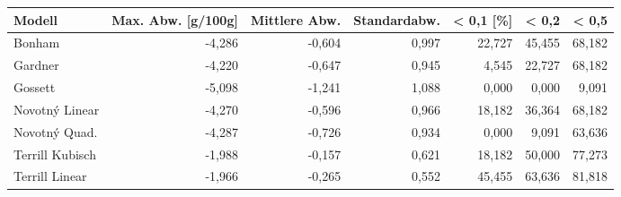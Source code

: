 \begin{tabular}{lrrrrrr}
\toprule
         Modell &  Max. Abw. [g/100g] &  Mittlere Abw. &  Standardabw. &  < 0,1 [\%] &  < 0,2 &  < 0,5 \\
\midrule
         Bonham &              -4,286 &         -0,604 &         0,997 &     22,727 & 45,455 & 68,182 \\
        Gardner &              -4,220 &         -0,647 &         0,945 &      4,545 & 22,727 & 68,182 \\
        Gossett &              -5,098 &         -1,241 &         1,088 &      0,000 &  0,000 &  9,091 \\
 Novotný Linear &              -4,270 &         -0,596 &         0,966 &     18,182 & 36,364 & 68,182 \\
  Novotný Quad. &              -4,287 &         -0,726 &         0,934 &      0,000 &  9,091 & 63,636 \\
Terrill Kubisch &              -1,988 &         -0,157 &         0,621 &     18,182 & 50,000 & 77,273 \\
 Terrill Linear &              -1,966 &         -0,265 &         0,552 &     45,455 & 63,636 & 81,818 \\
\bottomrule
\end{tabular}
